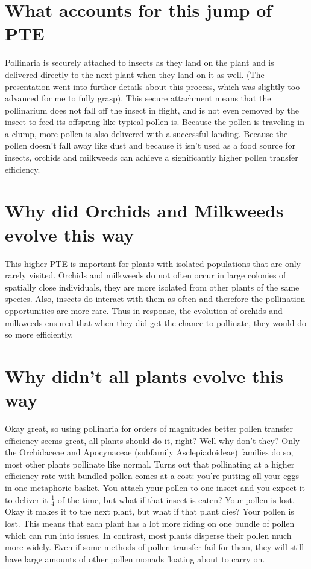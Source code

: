 \documentclass[12pt]{article}
\begin{document}
\section{What accounts for this jump of PTE}

Pollinaria is securely attached to insects as they land on the plant and is delivered directly to the next plant when they land on it as well. (The presentation went into further details about this process, which was slightly too advanced for me to fully grasp). This secure attachment means that the pollinarium does not fall off the insect in flight, and is not even removed by the insect to feed its offspring like typical pollen is. Because the pollen is traveling in a clump, more pollen is also delivered with a successful landing. Because the pollen doesn't fall away like dust and because it isn't used as a food source for insects, orchids and milkweeds can achieve a significantly higher pollen transfer efficiency. 

\section{Why did Orchids and Milkweeds evolve this way}

This higher PTE is important for plants with isolated populations that are only rarely visited. Orchids and milkweeds do not often occur in large colonies of spatially close individuals, they are more isolated from other plants of the same species. Also, insects do interact with them as often and therefore the pollination opportunities are more rare. Thus in response, the evolution of orchids and milkweeds ensured that when they did get the chance to pollinate, they would do so more efficiently. 

\section{Why didn't all plants evolve this way}

Okay great, so using pollinaria for orders of magnitudes better pollen transfer efficiency seems great, all plants should do it, right? Well why don't they? Only the Orchidaceae and Apocynaceae (subfamily Asclepiadoideae) families do so, most other plants pollinate like normal. Turns out that pollinating at a higher efficiency rate with bundled pollen comes at a cost: you're putting all your eggs in one metaphoric basket. You attach your pollen to one insect and you expect it to deliver it $\frac{1}{4}$ of the time, but what if that insect is eaten? Your pollen is lost. Okay it makes it to the next plant, but what if that plant dies? Your pollen is lost. This means that each plant has a lot more riding on one bundle of pollen which can run into issues. In contrast, most plants disperse their pollen much more widely. Even if some methods of pollen transfer fail for them, they will still have large amounts of other pollen monads floating about to carry on. 
\end{document}
